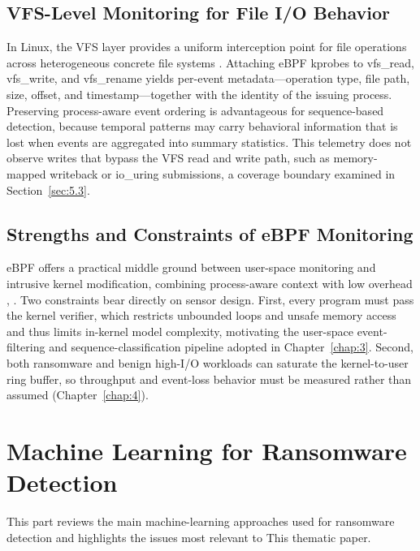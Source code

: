 \subsection{VFS-Level Monitoring for File I/\allowbreak{}O Behavior}\label{sec:2.2.3}

In Linux, the VFS layer provides a uniform interception point for file operations across heterogeneous concrete file systems \cite{ref41}. Attaching eBPF kprobes to vfs\_\allowbreak{}read, vfs\_\allowbreak{}write, and vfs\_\allowbreak{}rename yields per-event metadata---operation type, file path, size, offset, and timestamp---together with the identity of the issuing process. Preserving process-aware event ordering is advantageous for sequence-based detection, because temporal patterns may carry behavioral information that is lost when events are aggregated into summary statistics. This telemetry does not observe writes that bypass the VFS read and write path, such as memory-mapped writeback or io\_\allowbreak{}uring submissions, a coverage boundary examined in Section~\ref{sec:5.3}.

\subsection{Strengths and Constraints of eBPF Monitoring}\label{sec:2.2.4}

eBPF offers a practical middle ground between user-space monitoring and intrusive kernel modification, combining process-aware context with low overhead \cite{ref10}, \cite{ref11}. Two constraints bear directly on sensor design. First, every program must pass the kernel verifier, which restricts unbounded loops and unsafe memory access and thus limits in-kernel model complexity, motivating the user-space event-filtering and sequence-classification pipeline adopted in Chapter~\ref{chap:3}. Second, both ransomware and benign high-I/\allowbreak{}O workloads can saturate the kernel-to-user ring buffer, so throughput and event-loss behavior must be measured rather than assumed (Chapter~\ref{chap:4}).

\section{Machine Learning for Ransomware Detection}\label{sec:2.3}

This part reviews the main machine-learning approaches used for ransomware detection and highlights the issues most relevant to This thematic paper.

